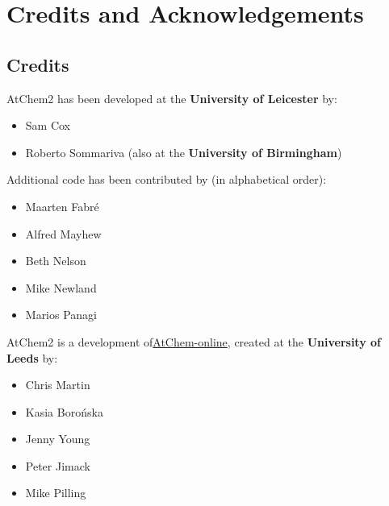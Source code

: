 %
%
%
%

\chapter{Credits and Acknowledgements} \label{ch:credits}

\section{Credits} \label{sec:credits}

AtChem2 has been developed at the \textbf{University of Leicester} by:

\begin{itemize}
\item Sam Cox
\item Roberto Sommariva (also at the \textbf{University of Birmingham})
\end{itemize}

Additional code has been contributed by (in alphabetical order):

\begin{itemize}
\item Maarten Fabr{\'e}
\item Alfred Mayhew
\item Beth Nelson
\item Mike Newland
\item Marios Panagi
\end{itemize}

AtChem2 is a development of\href{https://atchem.york.ac.uk/}{AtChem-online},
created at the \textbf{University of Leeds} by:

\begin{itemize}
\item Chris Martin
\item Kasia Boro{\'n}ska
\item Jenny Young
\item Peter Jimack
\item Mike Pilling
\end{itemize}

